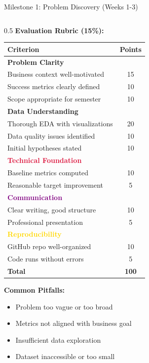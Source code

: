 \begin{frame}{Milestone 1: Problem Discovery (Weeks 1-3)}
\begin{columns}
\begin{column}{0.5\textwidth}
\textbf{Evaluation Rubric (15\%):}

\begin{table}
\tiny
\begin{tabular}{|l|c|}
\hline
\rowcolor{navyblue!20}
\textbf{Criterion} & \textbf{Points} \\
\hline
\textcolor{forest}{\textbf{Problem Clarity}} & \\
\hline
Business context well-motivated & 15 \\
Success metrics clearly defined & 10 \\
Scope appropriate for semester & 10 \\
\hline
\textcolor{navyblue}{\textbf{Data Understanding}} & \\
\hline
Thorough EDA with visualizations & 20 \\
Data quality issues identified & 10 \\
Initial hypotheses stated & 10 \\
\hline
\textcolor{crimson}{\textbf{Technical Foundation}} & \\
\hline
Baseline metrics computed & 10 \\
Reasonable target improvement & 5 \\
\hline
\textcolor{purple}{\textbf{Communication}} & \\
\hline
Clear writing, good structure & 10 \\
Professional presentation & 5 \\
\hline
\textcolor{gold}{\textbf{Reproducibility}} & \\
\hline
GitHub repo well-organized & 10 \\
Code runs without errors & 5 \\
\hline
\textbf{Total} & \textbf{100} \\
\hline
\end{tabular}
\end{table}

\vspace{0.2cm}

\textbf{Common Pitfalls:}
\begin{itemize}
\item[$\times$] Problem too vague or too broad
\item[$\times$] Metrics not aligned with business goal
\item[$\times$] Insufficient data exploration
\item[$\times$] Dataset inaccessible or too small
\end{itemize}
\end{column}
\end{columns}
\end{frame}

